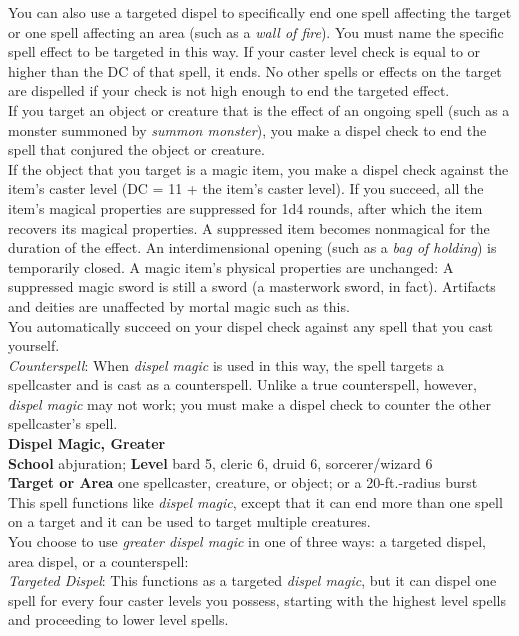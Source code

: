 You can also use a targeted dispel to specifically end one spell affecting the target or one spell affecting an area (such as a \textit{wall of fire}). You must name the specific spell effect to be targeted in this way. If your caster level check is equal to or higher than the DC of that spell, it ends. No other spells or effects on the target are dispelled if your check is not high enough to end the targeted effect.\\
If you target an object or creature that is the effect of an ongoing spell (such as a monster summoned by \textit{summon monster}), you make a dispel check to end the spell that conjured the object or creature.\\
If the object that you target is a magic item, you make a dispel check against the item's caster level (DC = 11 + the item's caster level). If you succeed, all the item's magical properties are suppressed for 1d4 rounds, after which the item recovers its magical properties. A suppressed item becomes nonmagical for the duration of the effect. An interdimensional opening (such as a \textit{bag of holding}) is temporarily closed. A magic item's physical properties are unchanged: A suppressed magic sword is still a sword (a masterwork sword, in fact). Artifacts and deities are unaffected by mortal magic such as this.\\
You automatically succeed on your dispel check against any spell that you cast yourself.\\
\textit{Counterspell}: When \textit{dispel magic }is used in this way, the spell targets a spellcaster and is cast as a counterspell. Unlike a true counterspell, however, \textit{dispel magic }may not work; you must make a dispel check to counter the other spellcaster's spell.\\
\textbf{Dispel Magic, Greater}\\
\textbf{School} abjuration; \textbf{Level} bard 5, cleric 6, druid 6, sorcerer/wizard 6\\
\textbf{Target or Area} one spellcaster, creature, or object; or a 20-ft.-radius burst\\
This spell functions like \textit{dispel magic}, except that it can end more than one spell on a target and it can be used to target multiple creatures. \\
You choose to use \textit{greater dispel magic }in one of three ways: a targeted dispel, area dispel, or a counterspell:\\
\textit{Targeted Dispel}: This functions as a targeted \textit{dispel magic}, but it can dispel one spell for every four caster levels you possess, starting with the highest level spells and proceeding to lower level spells.\\
